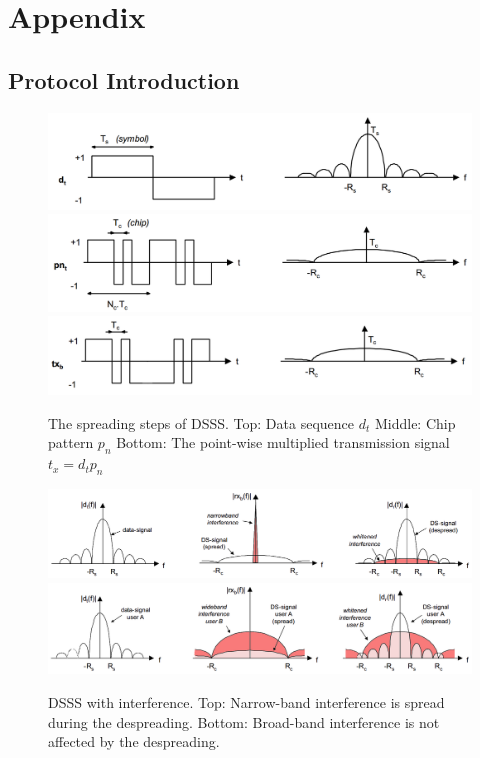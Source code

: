 \section{Appendix}
	\subsection{Protocol Introduction}
		\begin{figure}
			\includegraphics[width=\textwidth,keepaspectratio]{../presentation/imgs/dsss_ft_1.png}
			\includegraphics[width=\textwidth,keepaspectratio]{../presentation/imgs/dsss_ft_2.png}
			\includegraphics[width=\textwidth,keepaspectratio]{../presentation/imgs/dsss_ft_3.png}
			\caption{The spreading steps of DSSS.
				Top: Data sequence $d_t$
				Middle: Chip pattern $p_n$
				Bottom: The point-wise multiplied transmission signal $t_x = d_t p_n$
			}
			\label{dsss}
		\end{figure}
		\begin{figure}
			\includegraphics[width=\textwidth,keepaspectratio]{../presentation/imgs/dsss_inter_nar.png}
			\includegraphics[width=\textwidth,keepaspectratio]{../presentation/imgs/dsss_inter_broad.png}
			\caption{ DSSS with interference.
				Top: Narrow-band interference is spread during the despreading.
				Bottom: Broad-band interference is not affected by the despreading.
			}
			\label{dsss_interference}
		\end{figure}